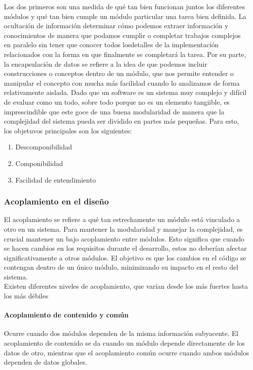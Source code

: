 Los dos primeros son una medida de qué tan bien funcionan juntos los diferentes módulos y qué tan bien cumple un módulo particular una tarea bien definida. La ocultación de información determinar cómo podemos extraer información y conocimientos de manera que podamos cumplir o completar trabajos complejos en paralelo sin tener que conocer todos losdetalles de la implementación relacionados con la forma en que finalmente se completará la tarea. Por su parte, la encapsulación de datos se refiere a la idea de que podemos incluir construcciones o conceptos dentro de un módulo, que nos permite entender o manipular el concepto con mucha más facilidad cuando lo analizamos de forma relativamente aislada. Dado que un software es un sistema muy complejo y difícil de evaluar como un todo, sobre todo porque no es un elemento tangiible, es imprescindible que este goce de una buena modularidad de manera que la complejidad del sistema pueda ser dividido en partes más pequeñas. Para esto, los objetuvos principales son los siguientes:
\begin{enumerate}
    \item Descomponibilidad
    \item Componibilidad
    \item Facilidad de entendimiento
\end{enumerate}

\subsubsection{Acoplamiento en el diseño} El acoplamiento se refiere a qué tan estrechamente un módulo está vinculado a otro en un sistema. Para mantener la modularidad y manejar la complejidad, es crucial mantener un bajo acoplamiento entre módulos. Esto significa que cuando se hacen cambios en los requisitos durante el desarrollo, estos no deberían afectar significativamente a otros módulos. El objetivo es que los cambios en el código se contengan dentro de un único módulo, minimizando su impacto en el resto del sistema. \\

Existen diferentes niveles de acoplamiento, que varían desde los más fuertes hasta los más débiles

\paragraph{Acoplamiento de contenido y común} Ocurre cuando dos módulos dependen de la misma información subyacente. El acoplamiento de contenido se da cuando un módulo depende directamente de los datos de otro, mientras que el acoplamiento común ocurre cuando ambos módulos dependen de datos globales.
